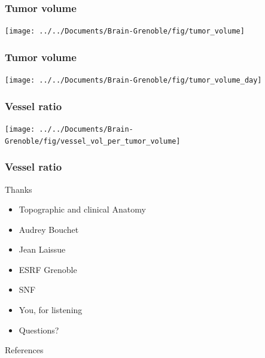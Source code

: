 \documentclass[caption=numbered]{beamer}
\newcommand{\imsize}{\linewidth}
\begin{document}
\renewcommand{\imsize}{0.8\textheight}
\begin{frame}
	\frametitle{Tumor volume}
	\texttt{[image: ../../Documents/Brain-Grenoble/fig/tumor\_volume]}
\end{frame}

\begin{frame}
	\frametitle{Tumor volume}
	\texttt{[image: ../../Documents/Brain-Grenoble/fig/tumor\_volume\_day]}
\end{frame}

\begin{frame}
	\frametitle{Vessel ratio}
	\texttt{[image: ../../Documents/Brain-Grenoble/fig/vessel\_vol\_per\_tumor\_volume]}
\end{frame}

\begin{frame}[label=current]
	\frametitle{Vessel ratio}
\end{frame}

\begin{frame}{Thanks}
	\begin{itemize}
		\item Topographic and clinical Anatomy
		\item Audrey Bouchet
		\item Jean Laissue
		\item ESRF Grenoble
		\item SNF
		\pause
		\item You, for listening
		\pause
		\item Questions?
	\end{itemize}
\end{frame}

\begin{frame}[allowframebreaks]{References}
	\renewcommand*{\bibfont}{\tiny}
	\printbibliography
\end{frame}
\end{document}
